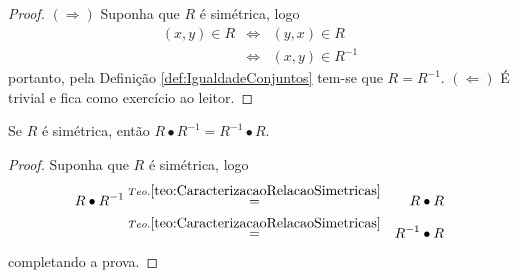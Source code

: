 \begin{proof}
	$(\Rightarrow)$ Suponha que $R$ é simétrica, logo
	\begin{eqnarray*}
		(x, y) \in R & \Longleftrightarrow & (y, x) \in R\\
		& \Longleftrightarrow & (x, y) \in R^{-1}
	\end{eqnarray*}
	portanto, pela Definição \ref{def:IgualdadeConjuntos} tem-se que $R = R^{-1}$. $(\Leftarrow)$ É trivial e fica como exercício ao leitor.
\end{proof}


\begin{corollary}
	Se $R$ é simétrica, então $R \bullet R^{-1} = R^{-1} \bullet R$.
\end{corollary}

\begin{proof}
	Suponha que $R$ é simétrica, logo
	\begin{eqnarray*}
		R \bullet R^{-1} & \stackrel{Teo. \ref{teo:CaracterizacaoRelacaoSimetricas}}{=} & R \bullet R\\
		& \stackrel{Teo. \ref{teo:CaracterizacaoRelacaoSimetricas}}{=} & R^{-1} \bullet R
	\end{eqnarray*}
	completando a prova.
\end{proof}

